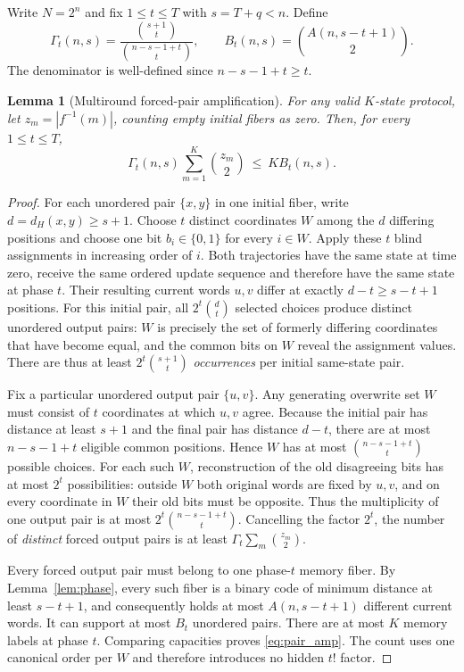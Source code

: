 \documentclass[11pt,a4paper]{article}
\newtheorem{lemma}[theorem]{Lemma}
\begin{document}
Write $N=2^n$ and fix $1\le t\le T$ with $s=T+q<n$. Define
\begin{equation}\label{eq:gamma}
 \Gamma_t(n,s)=\frac{\binom{s+1}{t}}{\binom{n-s-1+t}{t}},\qquad
 B_t(n,s)=\binom{A(n,s-t+1)}2.
\end{equation}
The denominator is well-defined since $n-s-1+t\ge t$.

\begin{lemma}[Multiround forced-pair amplification]\label{lem:multiround}
For any valid $K$-state protocol, let $z_m=|f^{-1}(m)|$, counting empty initial fibers as zero. Then, for every $1\le t\le T$,
\begin{equation}\label{eq:pair_amp}
\boxed{\quad
 \Gamma_t(n,s)\sum_{m=1}^{K}\binom{z_m}2
 \ \le\ K B_t(n,s).
\quad}
\end{equation}
\end{lemma}
\begin{proof}
For each unordered pair $\{x,y\}$ in one initial fiber, write $d=d_H(x,y)\ge s+1$. Choose $t$ distinct coordinates $W$ among the $d$ differing positions and choose one bit $b_i\in\{0,1\}$ for every $i\in W$. Apply these $t$ blind assignments in increasing order of $i$. Both trajectories have the same state at time zero, receive the same ordered update sequence and therefore have the same state at phase $t$. Their resulting current words $u,v$ differ at exactly $d-t\ge s-t+1$ positions. For this initial pair, all $2^t\binom dt$ selected choices produce distinct unordered output pairs: $W$ is precisely the set of formerly differing coordinates that have become equal, and the common bits on $W$ reveal the assignment values. There are thus at least $2^t\binom{s+1}t$ \emph{occurrences} per initial same-state pair.

Fix a particular unordered output pair $\{u,v\}$. Any generating overwrite set $W$ must consist of $t$ coordinates at which $u,v$ agree. Because the initial pair has distance at least $s+1$ and the final pair has distance $d-t$, there are at most $n-s-1+t$ eligible common positions. Hence $W$ has at most $\binom{n-s-1+t}t$ possible choices. For each such $W$, reconstruction of the old disagreeing bits has at most $2^t$ possibilities: outside $W$ both original words are fixed by $u,v$, and on every coordinate in $W$ their old bits must be opposite. Thus the multiplicity of one output pair is at most $2^t\binom{n-s-1+t}t$. Cancelling the factor $2^t$, the number of \emph{distinct} forced output pairs is at least $\Gamma_t\sum_m\binom{z_m}2$.

Every forced output pair must belong to one phase-$t$ memory fiber. By Lemma~\ref{lem:phase}, every such fiber is a binary code of minimum distance at least $s-t+1$, and consequently holds at most $A(n,s-t+1)$ different current words. It can support at most $B_t$ unordered pairs. There are at most $K$ memory labels at phase $t$. Comparing capacities proves \eqref{eq:pair_amp}. The count uses one canonical order per $W$ and therefore introduces no hidden $t!$ factor.
\end{proof}
\end{document}
